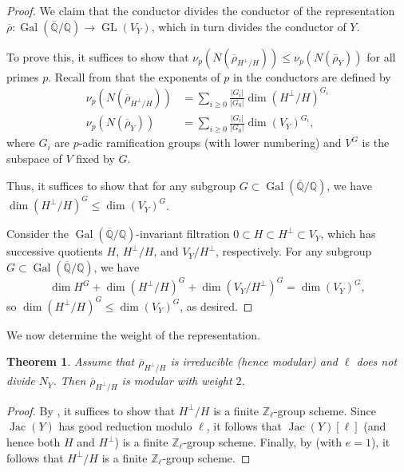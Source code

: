 \documentclass{amsproc}
\numberwithin{equation}{section}
\newtheorem{theorem}[equation]{Theorem}
\theoremstyle{definition}
\theoremstyle{remark}
\DeclareMathOperator{\Jac}{Jac}
\DeclareMathOperator{\GL}{GL}
\DeclareMathOperator{\Gal}{Gal}
\newcommand{\ZZ}{\mathbb Z}
\newcommand{\QQ}{\mathbb Q}
\newcommand{\Qbar}{\overline{\QQ}}
\newcommand{\GalQ}{\Gal(\Qbar/\QQ)}
\newcommand{\rhoHperpH}{\overline\rho_{H^\perp\!/H}}
\begin{document}
\begin{proof} 
    We claim that the conductor divides the conductor of the representation $\overline\rho : \Gal(\Qbar/\QQ)
     \to \GL(V_Y)$, which in turn divides the conductor of $Y$.

    To prove this, it suffices to show that $\nu_p(N(\rhoHperpH))
    \leq \nu_p(N(\overline\rho_Y))$ for all primes $p$.  
    Recall from \cite{serre} that the exponents of $p$ in the conductors
    are defined by
    \begin{align}
    \nu_p(N(\rhoHperpH)) &= \sum_{i\geq 0} \frac{|G_i|}{|G_0|}
    \dim (H^\perp/H)^{G_i} \\
    \nu_p(N(\overline\rho_Y)) &= \sum_{i\geq 0} \frac{|G_i|}{|G_0|}
    \dim (V_Y)^{G_i},
    \end{align}
    where $G_i$ are $p$-adic ramification groups 
    (with lower numbering)
    and $V^G$ is the subspace of $V$ fixed by $G$.

    Thus, it suffices to show that for any subgroup $G\subset\Gal(\Qbar/\QQ)$,
    we have $\dim (H^\perp/H)^G \leq \dim (V_Y)^G$.
    
    Consider the $\Gal(\Qbar/\QQ)$-invariant filtration
    $0 \subset H \subset H^\perp \subset V_Y$,
    which has successive quotients $H$, $H^\perp/H$, and $V_Y/H^\perp$, respectively. For any subgroup $G\subset\GalQ$, we have
    \begin{equation}
        \dim H^G + \dim(H^\perp/H)^G + \dim (V_Y/H^\perp)^G = \dim(V_Y)^G,
    \end{equation}
    so $\dim(H^\perp/H)^G \leq \dim (V_Y)^G$, as desired.
\end{proof}
We now determine the weight of the representation.

\begin{theorem}
    \label{thm:weight}
    Assume that $\rhoHperpH$ is irreducible (hence modular) and $\ell$ does not divide $N_Y$. Then $\rhoHperpH$ is modular with weight $2$.
\end{theorem}
\begin{proof}
By \cite[Prop.~4]{serre}, it suffices to show that $H^\perp/H$ is a finite $\ZZ_\ell$-group scheme.
Since $\Jac(Y)$ has good reduction modulo $\ell$, it follows that $\Jac(Y)[\ell]$ (and hence both $H$ and $H^\perp$) is a finite $\ZZ_\ell$-group scheme.
Finally, by \cite[Cor.~3.3.6 (1)]{raynaud} (with $e=1$), it follows that $H^\perp/H$ is a finite $\ZZ_\ell$-group scheme.
\end{proof}
\end{document}
